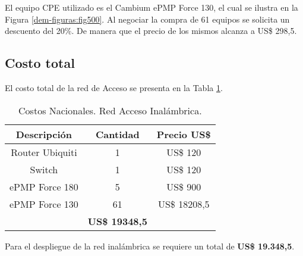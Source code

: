 El equipo CPE utilizado es el Cambium ePMP Force 130, el cual se ilustra en la Figura \ref{dem-figuras:fig500}. Al negociar la compra de 61 equipos se solicita un descuento del 20\%. De manera que el precio de los mismos alcanza a US\$ 298,5.


\subsection{Costo total}
El costo total de la red de Acceso se presenta en la Tabla \ref{tab:costo-red-acceso}.

\begin{table}[H]
  \centering

    \begin{tabular}{|c|c|c|}
    \hline
    \rowcolor[HTML]{C5D9F1} \textbf{Descripción} & \textbf{Cantidad} & \textbf{Precio US\$} \bigstrut\\
    \hline
    Router Ubiquiti & 1  & US\$ 120 \bigstrut\\
    \hline
    Switch & 1  & US\$ 120 \bigstrut\\
    \hline
    ePMP Force 180 & 5  & US\$ 900 \bigstrut\\
    \hline
    ePMP Force 130 & 61 & US\$ 18208,5 \bigstrut\\
    \hline
    \rowcolor[HTML]{C5D9F1} \multicolumn{2}{|c|}{\textbf{Total}} & \textbf{US\$ 19348,5} \bigstrut\\
    \hline
    \end{tabular}%
    \caption{Costos Nacionales. Red Acceso Inalámbrica.}
  \label{tab:costo-red-acceso}%
\end{table}%



Para el despliegue de la red inalámbrica se requiere un total de  \textbf{US\$ 19.348,5}.

\newpage






